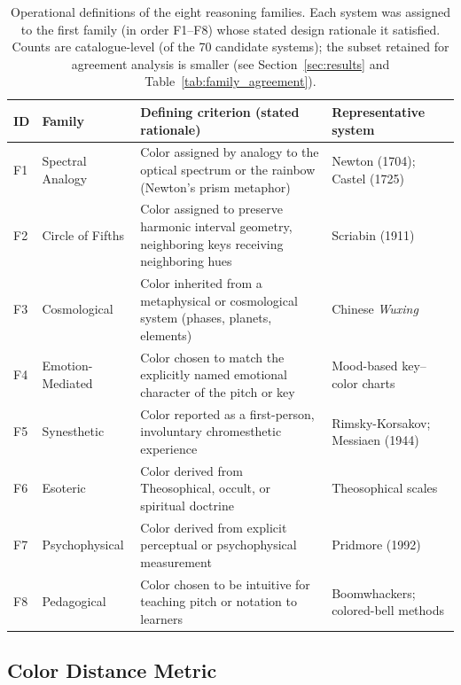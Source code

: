 \documentclass[12pt]{article}
\begin{document}
\begin{table}[htbp]
\centering
\caption{Operational definitions of the eight reasoning families. Each
system was assigned to the first family (in order F1--F8) whose stated
design rationale it satisfied. Counts are catalogue-level (of the 70
candidate systems); the subset retained for agreement analysis is
smaller (see Section~\ref{sec:results} and
Table~\ref{tab:family_agreement}).}
\label{tab:family_definitions}
\renewcommand{\arraystretch}{1.5}
\setlength{\tabcolsep}{6pt}
\begin{tabular}{@{}p{0.8cm}p{3.0cm}p{8.2cm}p{2.9cm}@{}}
\toprule
\textbf{ID} & \textbf{Family} & \textbf{Defining criterion (stated
  rationale)} & \textbf{Representative system} \\
\midrule
F1 & Spectral Analogy & Color assigned by analogy to the optical
  spectrum or the rainbow (Newton's prism metaphor) & Newton (1704);
  Castel (1725) \\
F2 & Circle of Fifths & Color assigned to preserve harmonic interval
  geometry, neighboring keys receiving neighboring hues & Scriabin
  (1911) \\
F3 & Cosmological & Color inherited from a metaphysical or
  cosmological system (phases, planets, elements) & Chinese
  \textit{Wuxing} \\
F4 & Emotion-Mediated & Color chosen to match the explicitly named
  emotional character of the pitch or key & Mood-based key--color
  charts \\
F5 & Synesthetic & Color reported as a first-person, involuntary
  chromesthetic experience & Rimsky-Korsakov; Messiaen (1944) \\
F6 & Esoteric & Color derived from Theosophical, occult, or spiritual
  doctrine & Theosophical scales \\
F7 & Psychophysical & Color derived from explicit perceptual or
  psychophysical measurement & Pridmore (1992) \\
F8 & Pedagogical & Color chosen to be intuitive for teaching pitch or
  notation to learners & Boomwhackers; colored-bell methods \\
\bottomrule
\end{tabular}
\end{table}

\subsection{Color Distance Metric}
\label{sec:metric}
\end{document}
